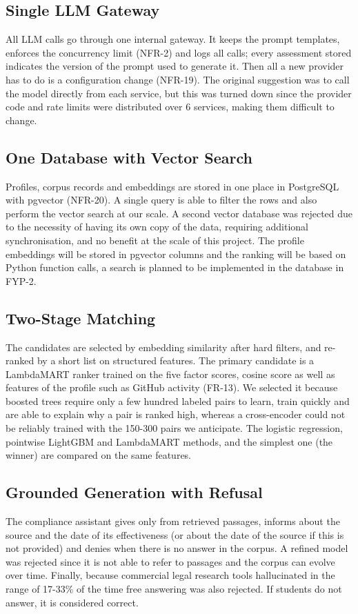 \documentclass{FastFyp}
\begin{document}
\subsection{Single LLM Gateway}
All LLM calls go through one internal gateway. It keeps the prompt templates, enforces the concurrency limit (NFR-2) and logs all calls; every assessment stored indicates the version of the prompt used to generate it. Then all a new provider has to do is a configuration change (NFR-19). The original suggestion was to call the model directly from each service, but this was turned down since the provider code and rate limits were distributed over 6 services, making them difficult to change.

\subsection{One Database with Vector Search}
Profiles, corpus records and embeddings are stored in one place in PostgreSQL with pgvector (NFR-20). A single query is able to filter the rows and also perform the vector search at our scale. A second vector database was rejected due to the necessity of having its own copy of the data, requiring additional synchronisation, and no benefit at the scale of this project. The profile embeddings will be stored in pgvector columns and the ranking will be based on Python function calls, a search is planned to be implemented in the database in FYP-2.

\subsection{Two-Stage Matching}
The candidates are selected by embedding similarity after hard filters, and re-ranked by a short list on structured features. The primary candidate is a LambdaMART ranker trained on the five factor scores, cosine score as well as features of the profile such as GitHub activity (FR-13). We selected it because boosted trees require only a few hundred labeled pairs to learn, train quickly and are able to explain why a pair is ranked high, whereas a cross-encoder could not be reliably trained with the 150-300 pairs we anticipate. The logistic regression, pointwise LightGBM and LambdaMART methods, and the simplest one (the winner) are compared on the same features.

\subsection{Grounded Generation with Refusal}
The compliance assistant gives only from retrieved passages, informs about the source and the date of its effectiveness (or about the date of the source if this is not provided) and denies when there is no answer in the corpus. A refined model was rejected since it is not able to refer to passages and the corpus can evolve over time. Finally, because commercial legal research tools hallucinated in the range of 17-33\% of the time \cite{ref:magesh2025} free answering was also rejected. If students do not answer, it is considered correct.
\end{document}
